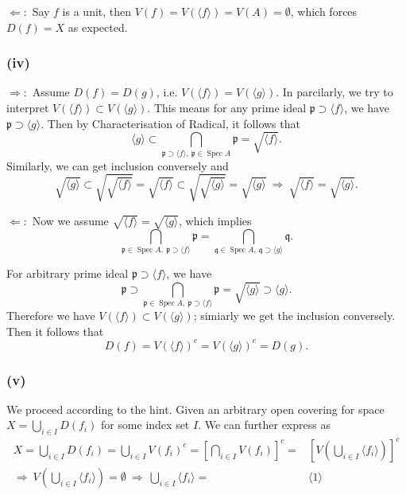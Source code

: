 $\Leftarrow:$ Say $f$ is a unit, then $V(f)=V(\langle f\rangle)=V(A)=\emptyset$, which forces $D(f)=X$ as expected. 

\subsubsection{(iv)}
$\Rightarrow:$ Assume $D(f)=D(g)$, i.e. $V(\langle f\rangle)=V(\langle g\rangle)$. In parcilarly, we try to interpret $V(\langle f\rangle)\subset V(\langle g\rangle)$. This means for any prime ideal $\mathfrak p\supset \langle f\rangle$, we have $\mathfrak p\supset \langle g\rangle$. Then by Characterisation of Radical, it follows that $$\langle g\rangle \subset \bigcap_{\mathfrak p\supset \langle f\rangle,~ \mathfrak p\in\operatorname{Spec}A}\mathfrak p= \sqrt{\langle f\rangle}.$$
Similarly, we can get inclusion conversely and 
$$\sqrt{\langle g\rangle}\subset \sqrt{\sqrt{\langle f\rangle}}=\sqrt{\langle f\rangle}\subset \sqrt{\sqrt{\langle g\rangle}}=\sqrt{\langle g\rangle} ~\Rightarrow~ \sqrt{\langle f\rangle}=\sqrt{\langle g\rangle}.$$

$\Leftarrow:$ Now we assume $\sqrt{\langle f\rangle}=\sqrt{\langle g\rangle}$, which implies 
$$\bigcap_{\mathfrak p\in\operatorname{Spec}A,~ \mathfrak p\supset \langle f\rangle}\mathfrak p=\bigcap_{\mathfrak q\in\operatorname{Spec}A,~ \mathfrak q\supset \langle g\rangle}\mathfrak q.$$

For arbitrary prime ideal $\mathfrak p\supset \langle f\rangle$, we have 
$$\mathfrak p\supset \bigcap_{\mathfrak p\in\operatorname{Spec}A,~ \mathfrak p\supset \langle f\rangle}\mathfrak p=\sqrt{\langle g\rangle}\supset \langle g\rangle.$$
Therefore we have $V(\langle f\rangle)\subset V(\langle g\rangle)$; simiarly we get the inclusion conversely. Then it follows that $$D(f)=V(\langle f\rangle)^c=V(\langle g\rangle)^c=D(g).$$
\subsubsection{(v)}
We proceed according to the hint. 
Given an arbitrary open covering for space $X=\bigcup_{i\in I}D(f_i)$ for some index set $I$. 
We can further express as \begin{align*}
    X = \bigcup_{i\in I}D(f_i)
    = \bigcup_{i\in I} V(f_i)^c
    = \left[\bigcap_{i\in I} V(f_i)\right]^c
    =& \left[V\left(\bigcup_{i\in I}\langle f_i\rangle\right)\right]^c\\
    \Rightarrow~ V\left(\bigcup_{i\in I}\langle f_i\rangle\right)=\emptyset 
    ~\Rightarrow~ \bigcup_{i\in I}\langle f_i\rangle=&\langle 1\rangle
\end{align*}  

